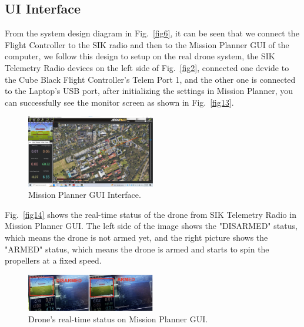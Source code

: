 \subsection{UI Interface}

From the system design diagram in Fig.~\ref{fig6}, it can be seen that we connect the Flight Controller to the SIK radio and then to the Mission Planner GUI of the computer, we follow this design to setup on the real drone system, the SIK Telemetry Radio devices on the left side of Fig.~\ref{fig2}, connected one devide to the Cube Black Flight Controller's Telem Port 1, and the other one is connected to the Laptop's USB port, after initializing the settings in Mission Planner, you can successfully see the monitor screen as shown in Fig.~\ref{fig13}.

\begin{figure}[H]
    \centerline{\includegraphics[width=0.5\textwidth]{Figures/Results/Mission_Planner_GUI.png}}
    \caption{Mission Planner GUI Interface.}
    \label{fig15}
\end{figure}

Fig.~\ref{fig14} shows the real-time status of the drone from SIK Telemetry Radio in Mission Planner GUI. The left side of the image shows the "DISARMED" status, which means the drone is not armed yet, and the right picture shows the "ARMED" status, which means the drone is armed and starts to spin the propellers at a fixed speed.

\begin{figure}[H]
    \centerline{\includegraphics[width=0.5\textwidth]{Figures/Results/GUI_Status.png}}
    \caption{Drone's real-time status on Mission Planner GUI.}
    \label{fig16}
\end{figure}